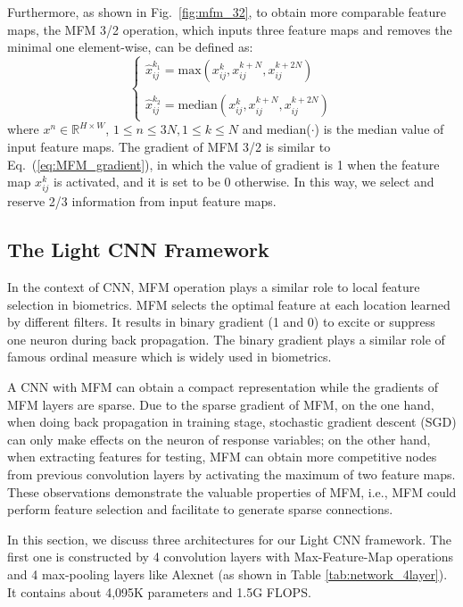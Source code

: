 \documentclass[journal,transmag]{IEEEtran}
\begin{document}
Furthermore, as shown in Fig.~\ref{fig:mfm_32}, to obtain more comparable feature maps, the MFM 3/2 operation, which inputs three feature maps and removes the minimal one element-wise, can be defined as:
\begin{equation}
\left\{
\begin{array}{l}
\hat{x}^{k_1}_{ij}=\text{max}(x^{k}_{ij}, x^{k+N}_{ij}, x^{k+2N}_{ij}) \\
\\
\hat{x}^{k_2}_{ij}=\text{median}(x^{k}_{ij}, x^{k+N}_{ij}, x^{k+2N}_{ij})
\end{array}
\right.
\label{eq:MFM_32}
\end{equation}
where $x^n \in \mathbb{R}^{H\times W}$,  $1 \leq n \leq 3N, 1 \leq k \leq N$ and median($\cdot$) is the median value of input feature maps. The gradient of MFM 3/2 is similar to Eq.~(\ref{eq:MFM_gradient}), in which the value of gradient is 1 when the feature map $x^{k}_{ij}$ is activated, and it is set to be 0 otherwise. In this way, we select and reserve 2/3 information from input feature maps.

\subsection{The Light CNN Framework}
In the context of CNN, MFM operation plays a similar role to local feature selection in biometrics.
MFM selects the optimal feature at each location learned by different filters. It results in binary gradient (1 and 0) to excite or suppress one neuron during back propagation. The binary gradient plays a similar role of famous ordinal measure \cite{DBLP:journals/pami/SunT09} which is widely used in biometrics.

A CNN with MFM can obtain a compact representation while the gradients of MFM layers are sparse. Due to the sparse gradient of MFM, on the one hand, when doing back propagation in training stage, stochastic gradient descent (SGD) can only make effects on the neuron of response variables; on the other hand, when extracting features for testing, MFM can obtain more competitive nodes from previous convolution layers by activating the maximum of two feature maps. These observations demonstrate the valuable properties of MFM, i.e., MFM could perform feature selection and facilitate to generate sparse connections.

In this section, we discuss three architectures for our Light CNN framework. The first one is constructed by 4 convolution layers with Max-Feature-Map operations and 4 max-pooling layers like Alexnet \cite{DBLP:conf/nips/KrizhevskySH12} (as shown in Table \ref{tab:network_4layer}). It contains about 4,095K parameters and 1.5G FLOPS.
\end{document}
